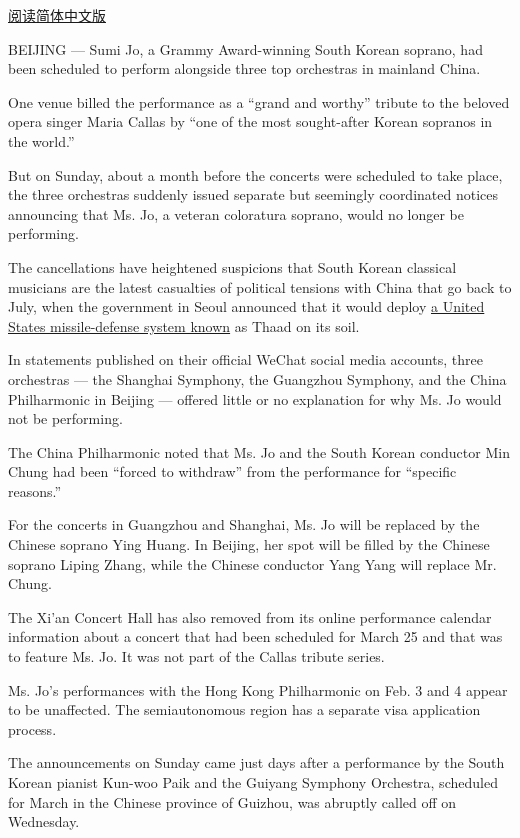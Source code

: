 \href{http://cn.nytimes3xbfgragh.onion/china/20170124/sumi-jo-soprano-maria-callas/}{阅读简体中文版}

BEIJING --- Sumi Jo, a Grammy Award-winning South Korean soprano, had
been scheduled to perform alongside three top orchestras in mainland
China.

One venue billed the performance as a ``grand and worthy'' tribute to
the beloved opera singer Maria Callas by ``one of the most sought-after
Korean sopranos in the world.''

But on Sunday, about a month before the concerts were scheduled to take
place, the three orchestras suddenly issued separate but seemingly
coordinated notices announcing that Ms. Jo, a veteran coloratura
soprano, would no longer be performing.

The cancellations have heightened suspicions that South Korean classical
musicians are the latest casualties of political tensions with China
that go back to July, when the government in Seoul announced that it
would deploy
\href{https://www.nytimes3xbfgragh.onion/2016/07/09/world/asia/south-korea-us-thaad-china.html}{a
United States missile-defense system known} as Thaad on its soil.

In statements published on their official WeChat social media accounts,
three orchestras --- the Shanghai Symphony, the Guangzhou Symphony, and
the China Philharmonic in Beijing --- offered little or no explanation
for why Ms. Jo would not be performing.

The China Philharmonic noted that Ms. Jo and the South Korean conductor
Min Chung had been ``forced to withdraw'' from the performance for
``specific reasons.''

For the concerts in Guangzhou and Shanghai, Ms. Jo will be replaced by
the Chinese soprano Ying Huang. In Beijing, her spot will be filled by
the Chinese soprano Liping Zhang, while the Chinese conductor Yang Yang
will replace Mr. Chung.

The Xi'an Concert Hall has also removed from its online performance
calendar information about a concert that had been scheduled for March
25 and that was to feature Ms. Jo. It was not part of the Callas tribute
series.

Ms. Jo's performances with the Hong Kong Philharmonic on Feb. 3 and 4
appear to be unaffected. The semiautonomous region has a separate visa
application process.

The announcements on Sunday came just days after a performance by the
South Korean pianist Kun-woo Paik and the Guiyang Symphony Orchestra,
scheduled for March in the Chinese province of Guizhou, was abruptly
called off on Wednesday.

